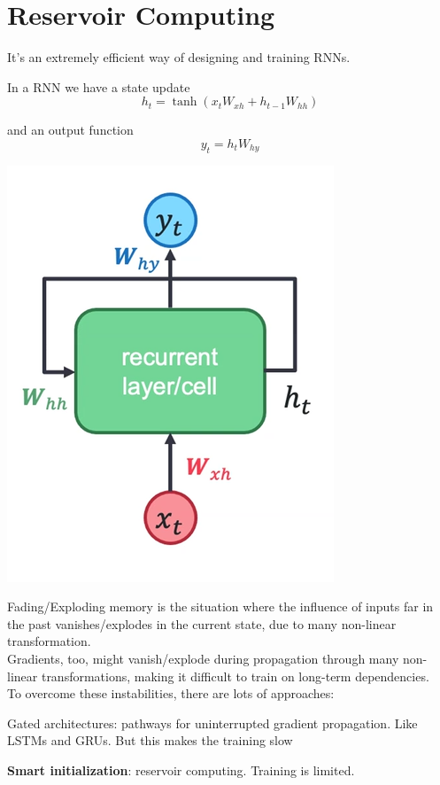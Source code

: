 \documentclass[10pt]{report}
\begin{document}
\section{Reservoir Computing}
It's an extremely efficient way of designing and training RNNs.
\begin{multicols}{2}
In a RNN we have a state update $$h_t=\tanh(x_t W_{xh} + h_{t-1}W_{hh})$$

and an output function $$y_t = h_tW_{hy}$$
\begin{center}
	\includegraphics[scale=0.5]{101.png}
\end{center}
\end{multicols}
Fading/Exploding memory is the situation where the influence of inputs far in the past vanishes/explodes in the current state, due to many non-linear transformation.\\
Gradients, too, might vanish/explode during propagation through many non-linear transformations, making it difficult to train on long-term dependencies.\\
To overcome these instabilities, there are lots of approaches:
\begin{list}{}{}
	\item Gated architectures: pathways for uninterrupted gradient propagation. Like LSTMs and GRUs. But this makes the training slow
	\item \textbf{Smart initialization}: reservoir computing. Training is limited.
\end{list}
\end{document}
